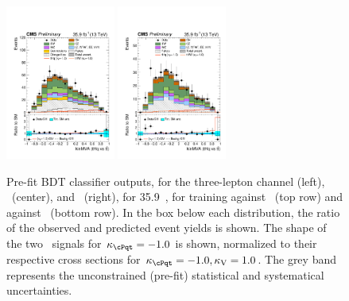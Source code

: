 \begin{figure}[!htb]
\begin{center}
    \includegraphics[width=0.32\textwidth]{Figures/polished/thqMVA_tt_2lss_40_em.pdf}
    \includegraphics[width=0.32\textwidth]{Figures/polished/thqMVA_tt_2lss_40_mm.pdf}
  \end{center}
  \caption{Pre-fit BDT classifier outputs, for the three-lepton channel (left), \emu\ (center), and \mumu\ (right), for 35.9~\fbinv, for training against \ttV\ (top row) and against \ttbar\ (bottom row).
  In the box below each distribution, the ratio of the observed and predicted event yields is shown.
  The shape of the two \tH\ signals for $\Ct=-1.0$ is shown, normalized to their respective cross sections for $\Ct=-1.0, \CV=1.0$.
  The grey band represents the unconstrained (pre-fit) statistical and systematical uncertainties.\label{fig:postfitshapes}}
\end{figure}

